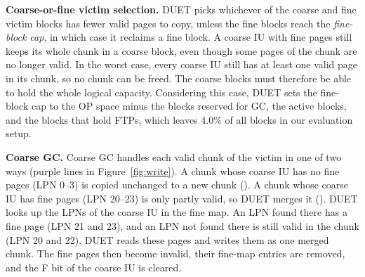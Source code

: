 \textbf{Coarse-or-fine victim selection.} DUET picks whichever of the coarse and fine victim blocks has fewer
valid pages to copy, unless the fine blocks reach the \emph{fine-block cap}, in which case it reclaims a fine block.
A coarse IU with fine pages still keeps its whole chunk in a
coarse block, even though some pages of the chunk are no longer valid. In the worst case, every coarse IU still has
at least one valid page in its chunk, so no chunk can be freed. The coarse blocks must therefore be
able to hold the whole logical capacity. Considering this case, DUET sets the fine-block cap to the OP
space minus the blocks reserved for GC, the active blocks, and the blocks that
hold FTPs, which leaves 4.0\% of all blocks in our evaluation setup.

\textbf{Coarse GC.} Coarse GC handles each valid chunk of the victim in
one of two ways (purple lines in Figure~\ref{fig:write}). A chunk whose coarse
IU has no fine pages (LPN 0--3) is copied unchanged to a new chunk (). A
chunk whose coarse IU has fine pages (LPN 20--23) is only partly valid, so DUET
merges it (). DUET looks up the LPNs of the coarse IU in the fine map.
An LPN found there has a fine page (LPN 21 and 23), and an LPN not found there
is still valid in the chunk (LPN 20 and 22). DUET reads these pages and writes
them as one merged chunk. The fine pages then become invalid, their fine-map
entries are removed, and the F bit of the coarse IU is cleared.

